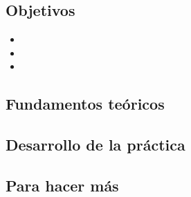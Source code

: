 \documentclass[../main.tex]{subfiles}
\begin{document}


    \subsection{Objetivos}
        \begin{itemize}
            \item 
            \item 
            \item 
        \end{itemize}

    \subsection{Fundamentos teóricos}
       

    \subsection{Desarrollo de la práctica}

    
    \subsection{Para hacer más}
\end{document}
